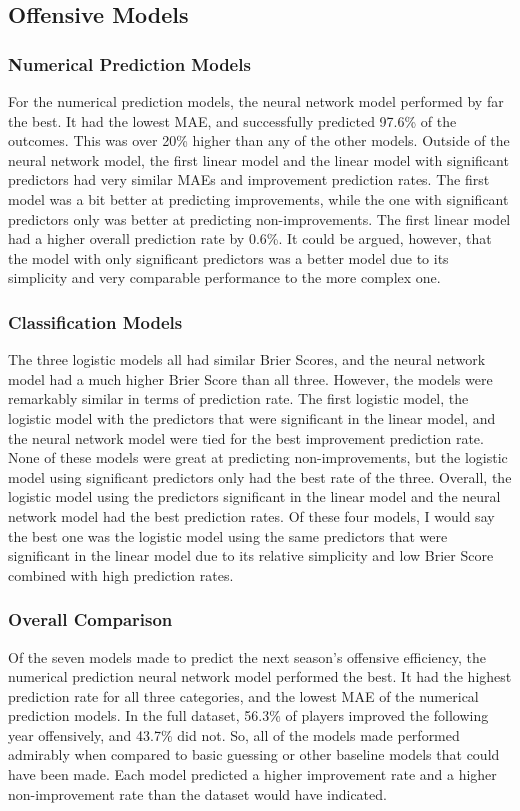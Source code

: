 \documentclass[12pt]{article}
\begin{document}
\subsection{Offensive Models}
\label{subsec:off-results}
\subsubsection{Numerical Prediction Models}
\label{subsubsec:npoff-results}
For the numerical prediction models, the neural network model performed by far the best. It had the lowest MAE, and successfully predicted 97.6\% of the outcomes. This was over 20\% higher than any of the other models. Outside of the neural network model, the first linear model and the linear model with significant predictors had very similar MAEs and improvement prediction rates. The first model was a bit better at predicting improvements, while the one with significant predictors only was better at predicting non-improvements. The first linear model had a higher overall prediction rate by 0.6\%. It could be argued, however, that the model with only significant predictors was a better model due to its simplicity and very comparable performance to the more complex one. 
\subsubsection{Classification Models}
\label{subsubsec:classoff-results}
The three logistic models all had similar Brier Scores, and the neural network model had a much higher Brier Score than all three. However, the models were remarkably similar in terms of prediction rate. The first logistic model, the logistic model with the predictors that were significant in the linear model, and the neural network model were tied for the best improvement prediction rate. None of these models were great at predicting non-improvements, but the logistic model using significant predictors only had the best rate of the three. Overall, the logistic model using the predictors significant in the linear model and the neural network model had the best prediction rates. Of these four models, I would say the best one was the logistic model using the same predictors that were significant in the linear model due to its relative simplicity and low Brier Score combined with high prediction rates. 
\subsubsection{Overall Comparison}
\label{subsubsec:ovroff-results}
Of the seven models made to predict the next season's offensive efficiency, the numerical prediction neural network model performed the best. It had the highest prediction rate for all three categories, and the lowest MAE of the numerical prediction models. In the full dataset, 56.3\% of players improved the following year offensively, and 43.7\% did not. So, all of the models made performed admirably when compared to basic guessing or other baseline models that could have been made. Each model predicted a higher improvement rate and a higher non-improvement rate than the dataset would have indicated.
\end{document}
